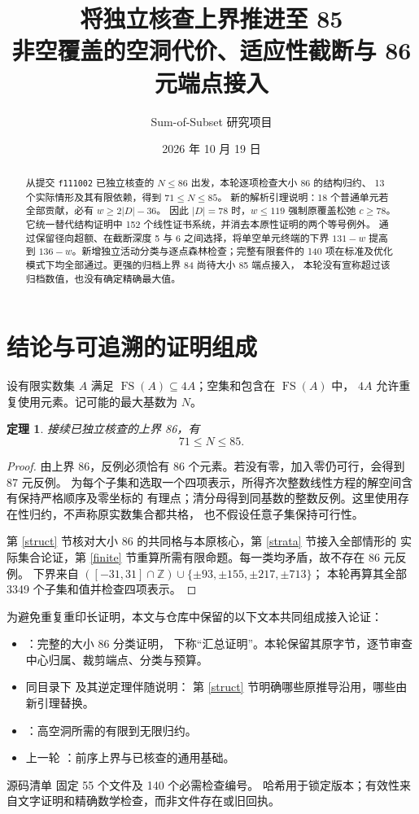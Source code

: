\documentclass[11pt,a4paper]{article}
\title{将独立核查上界推进至 85\\\large 非空覆盖的空洞代价、适应性截断与 86 元端点接入}
\author{Sum-of-Subset 研究项目}
\date{2026 年 10 月 19 日}
\newcommand{\FS}{\operatorname{FS}}
\newcommand{\Z}{\mathbb Z}
\newtheorem{theorem}{定理}[section]
\begin{document}
\maketitle
\begin{abstract}
从提交 \texttt{f111002} 已独立核查的 $N\le86$ 出发，本轮逐项检查大小 86 的结构归约、
13 个实际情形及其有限依赖，得到 $71\le N\le85$。
新的解析引理说明：18 个普通单元若全部贡献，必有 $w\ge2|D|-36$。
因此 $|D|=78$ 时，$w\le119$ 强制原覆盖松弛 $c\ge78$。
它统一替代结构证明中 152 个线性证书系统，并消去本原性证明的两个等号例外。
通过保留径向超额、在截断深度 5 与 6 之间选择，将单空单元终端的下界
$131-w$ 提高到 $136-w$。新增独立活动分类与逐点森林检查；完整有限套件的
140 项在标准及优化模式下均全部通过。更强的归档上界 84 尚待大小 85 端点接入，
本轮没有宣称超过该归档数值，也没有确定精确最大值。
\end{abstract}

\section{结论与可追溯的证明组成}
设有限实数集 $A$ 满足 $\FS(A)\subseteq4A$；空集和包含在 $\FS(A)$ 中，
$4A$ 允许重复使用元素。记可能的最大基数为 $N$。
\begin{theorem}
接续已独立核查的上界 86，有
\[\boxed{71\le N\le85.}\]
\end{theorem}
\begin{proof}
由上界 86，反例必须恰有 86 个元素。若没有零，加入零仍可行，会得到 87 元反例。
为每个子集和选取一个四项表示，所得齐次整数线性方程的解空间含有保持严格顺序及零坐标的
有理点；清分母得到同基数的整数反例。这里使用存在性归约，不声称原实数集合都共格，
也不假设任意子集保持可行性。

第 \ref{struct} 节核对大小 86 的共同格与本原核心，第 \ref{strata} 节接入全部情形的
实际集合论证，第 \ref{finite} 节重算所需有限命题。每一类均矛盾，故不存在 86 元反例。
下界来自
$([-31,31]\cap\Z)\cup\{\pm93,\pm155,\pm217,\pm713\}$；
本轮再算其全部 3349 个子集和值并检查四项表示。
\end{proof}

为避免重复重印长证明，本文与仓库中保留的以下文本共同组成接入论证：
\begin{itemize}
\item {}：完整的大小 86 分类证明，
下称“汇总证明”。本轮保留其原字节，逐节审查中心归属、裁剪端点、分类与预算。
\item 同目录下  及其逆定理伴随说明：
第 \ref{struct} 节明确哪些原推导沿用，哪些由新引理替换。
\item {}：高空洞所需的有限到无限归约。
\item 上一轮 ：前序上界与已核查的通用基础。
\end{itemize}
源码清单  固定 55 个文件及 140 个必需检查编号。
哈希用于锁定版本；有效性来自文字证明和精确数学检查，而非文件存在或旧回执。
\end{document}
